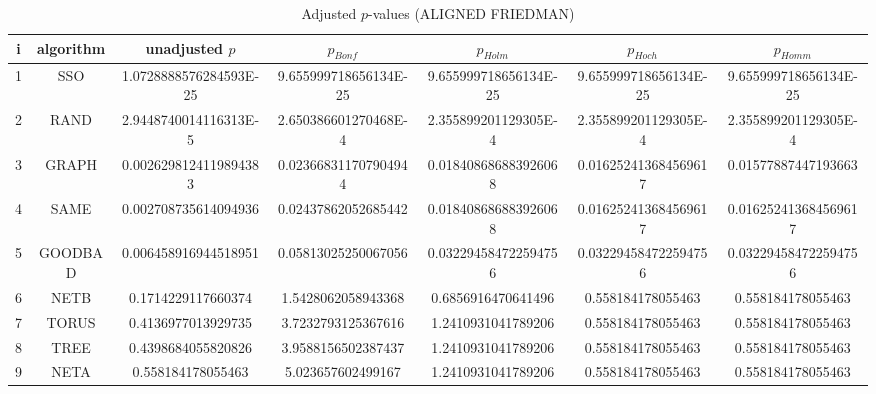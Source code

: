 \documentclass[a4paper,10pt]{article}
\begin{document}
\begin{landscape}
\begin{table}[!htp]
\centering\scriptsize
\caption{Adjusted $p$-values (ALIGNED FRIEDMAN)}
\begin{tabular}{ccccccc}
i&algorithm&unadjusted $p$&$p_{Bonf}$&$p_{Holm}$&$p_{Hoch}$&$p_{Homm}$\\
\hline
1& SSO&1.0728888576284593E-25&9.655999718656134E-25&9.655999718656134E-25&9.655999718656134E-25&9.655999718656134E-25\\
2& RAND&2.9448740014116313E-5&2.650386601270468E-4&2.355899201129305E-4&2.355899201129305E-4&2.355899201129305E-4\\
3& GRAPH&0.0026298124119894383&0.023668311707904944&0.018408686883926068&0.016252413684569617&0.01577887447193663\\
4& SAME&0.002708735614094936&0.02437862052685442&0.018408686883926068&0.016252413684569617&0.016252413684569617\\
5& GOODBAD&0.006458916944518951&0.05813025250067056&0.032294584722594756&0.032294584722594756&0.032294584722594756\\
6& NETB&0.1714229117660374&1.5428062058943368&0.6856916470641496&0.558184178055463&0.558184178055463\\
7& TORUS&0.4136977013929735&3.7232793125367616&1.2410931041789206&0.558184178055463&0.558184178055463\\
8& TREE&0.4398684055820826&3.9588156502387437&1.2410931041789206&0.558184178055463&0.558184178055463\\
9& NETA&0.558184178055463&5.023657602499167&1.2410931041789206&0.558184178055463&0.558184178055463\\
\hline
\end{tabular}
\end{table}


\end{landscape}
\end{document}
